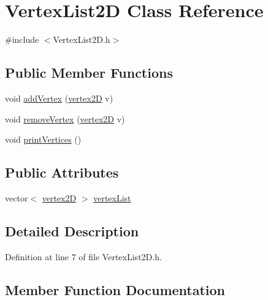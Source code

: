 \hypertarget{class_vertex_list2_d}{}\section{Vertex\+List2D Class Reference}
\label{class_vertex_list2_d}


{\ttfamily \#include $<$Vertex\+List2\+D.\+h$>$}

\subsection*{Public Member Functions}
\begin{DoxyCompactItemize}
\item 
void \mbox{\hyperlink{class_vertex_list2_d_a0fd23037d46f613d1f6f9d7d91ba2627}{add\+Vertex}} (\mbox{\hyperlink{structvertex2_d}{vertex2D}} v)
\item 
void \mbox{\hyperlink{class_vertex_list2_d_af5f14271403582b3648b184d90f0c1d4}{remove\+Vertex}} (\mbox{\hyperlink{structvertex2_d}{vertex2D}} v)
\item 
void \mbox{\hyperlink{class_vertex_list2_d_a4ac4c80ae89813ad34bcd68c9ac5b97e}{print\+Vertices}} ()
\end{DoxyCompactItemize}
\subsection*{Public Attributes}
\begin{DoxyCompactItemize}
\item 
vector$<$ \mbox{\hyperlink{structvertex2_d}{vertex2D}} $>$ \mbox{\hyperlink{class_vertex_list2_d_aeb7d8ca4a85b8e0f2bf495e44e52e9e6}{vertex\+List}}
\end{DoxyCompactItemize}


\subsection{Detailed Description}


Definition at line 7 of file Vertex\+List2\+D.\+h.



\subsection{Member Function Documentation}
\mbox{\label{class_vertex_list2_d_a0fd23037d46f613d1f6f9d7d91ba2627}} 
